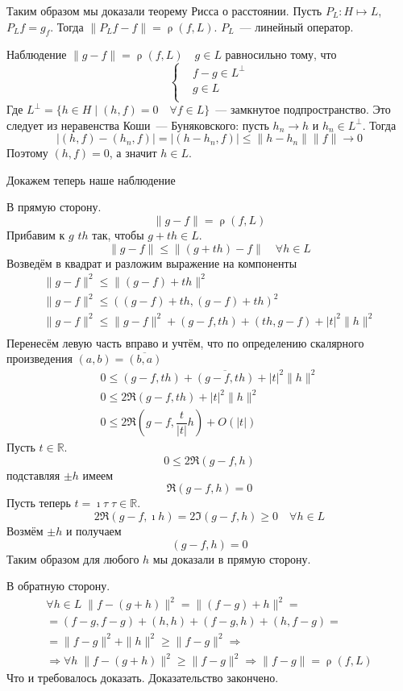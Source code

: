 \documentclass[14pt]{extarticle}
\DeclareMathOperator{\rh}{\rho}
\begin{document}
Таким образом мы доказали теорему Рисса о расстоянии.
Пусть $P_L : H \mapsto L$, $P_L f = g_f$.
Тогда $\|P_Lf - f\| = \rh(f, L)$. $P_L$~--- линейный оператор.
\begin{MathCl}{Наблюдение}
	$\|g - f\| = \rh(f, L)\quad g \in L$ равносильно тому, что 
	$$
	\left\{
		\begin{aligned}
			&f - g \in L^\perp\\
        	&g \in L\\
    	\end{aligned}
	\right.
	$$
	Где $L^\perp = \{h \in H \mid (h, f) = 0 \quad \forall f \in L\}$~--- замкнутое подпространство.
	Это следует из неравенства Коши~--- Буняковского: пусть $h_n \to h$ и $h_n \in L^\perp$.
	Тогда
	$$
	|(h, f) - (h_n, f)| = |(h - h_n, f)| \le \|h - h_n\| \|f\|\to 0
	$$
	Поэтому $(h, f)=0$, а значит $h \in L$.
\end{MathCl}
Докажем теперь наше наблюдение
\begin{Proof}
    В прямую сторону.
    $$
    \|g - f\| = \rh(f, L)
    $$
    Прибавим к $g$ $th$ так, чтобы $g + th \in L$.
    $$
    \|g - f\| \le \|(g + t h) - f\| \quad \forall h \in L
    $$
    Возведём в квадрат и разложим выражение на компоненты
    \begin{gather*}
        \|g - f\|^2 \le \|(g - f) + t h\|^2\\
        \|g - f\|^2 \le ((g - f) + t h, (g - f) + t h)^2\\
        \|g - f\|^2 \le \|g - f\|^2 + (g - f, t h) + (t h, g - f) + |t|^2 \|h\|^2\\
	\end{gather*}
	Перенесём левую часть вправо и учтём, что по определению скалярного произведения $(a, b) = \overline{(b, a)}$
	\begin{gather*}
        0 \le (g - f, t h) + \overline{(g - f, t h)} + |t|^2 \|h\|^2\\ 
        0 \le 2\Re(g - f,t h) + |t|^2 \|h\|^2\\
        0 \le 2\Re(g - f, \dfrac{t}{|t|} h) + O(|t|)
	\end{gather*}
    Пусть $t \in \mathbb R$.
    $$
    0 \le 2\Re(g - f, h)
    $$
    подставляя $\pm h$ имеем
    $$
    \Re(g - f, h) = 0
    $$
    Пусть теперь $t = \imath \tau\; \tau \in \mathbb R$.
    $$
    2\Re(g - f, \imath h) = 2\Im(g - f, h) \ge 0\quad\forall h \in L
    $$
    Возмём $\pm h$ и получаем
    $$
    (g - f, h) = 0
    $$
    Таким образом для любого $h$ мы доказали в прямую сторону.
    
    В обратную сторону.
    \begin{multline*}
    \forall h \in L\;\|f - (g + h)\|^2 = \|(f - g) + h\|^2 =\\
     = (f - g, f - g) + (h, h) + (f - g, h) + (h, f - g) =\\
    = \|f - g\|^2+\|h\|^2 \ge \|f - g\|^2 \Rightarrow \\
    \Rightarrow \forall h\;\|f - (g + h)\|^2 \ge \|f - g\|^2 \Rightarrow \|f - g\| = \rh(f, L)
    \end{multline*}
    Что и требовалось доказать.
    Доказательство закончено.
\end{Proof}
\end{document}
